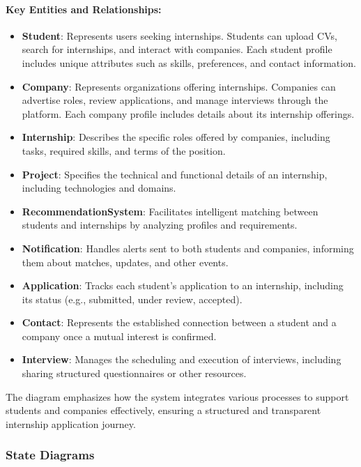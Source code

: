 \documentclass[12pt]{article}
\begin{document}
\paragraph{Key Entities and Relationships:}
\begin{itemize}
    \item \textbf{Student}: Represents users seeking internships. Students can upload CVs, search for internships, and interact with companies. Each student profile includes unique attributes such as skills, preferences, and contact information.
    \item \textbf{Company}: Represents organizations offering internships. Companies can advertise roles, review applications, and manage interviews through the platform. Each company profile includes details about its internship offerings.
    \item \textbf{Internship}: Describes the specific roles offered by companies, including tasks, required skills, and terms of the position.
    \item \textbf{Project}: Specifies the technical and functional details of an internship, including technologies and domains.
    \item \textbf{RecommendationSystem}: Facilitates intelligent matching between students and internships by analyzing profiles and requirements.
    \item \textbf{Notification}: Handles alerts sent to both students and companies, informing them about matches, updates, and other events.
    \item \textbf{Application}: Tracks each student’s application to an internship, including its status (e.g., submitted, under review, accepted).
    \item \textbf{Contact}: Represents the established connection between a student and a company once a mutual interest is confirmed.
    \item \textbf{Interview}: Manages the scheduling and execution of interviews, including sharing structured questionnaires or other resources.
\end{itemize}

The diagram emphasizes how the system integrates various processes to support students and companies effectively, ensuring a structured and transparent internship application journey.


\newpage

\subsubsection{ State Diagrams}
\end{document}
